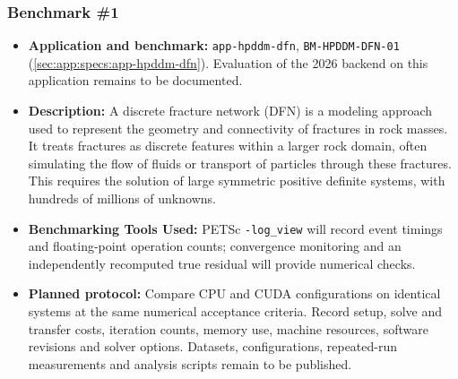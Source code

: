 \subsubsection{Benchmark \#1}
\begin{itemize}
    \item \textbf{Application and benchmark:} \texttt{app-hpddm-dfn}, \texttt{BM-HPDDM-DFN-01} (\cref{sec:app:specs:app-hpddm-dfn}). Evaluation of the 2026 backend on this application remains to be documented.
    \item \textbf{Description:} A discrete fracture network (DFN) is a modeling approach used to represent the geometry and connectivity of fractures in rock masses. It treats fractures as discrete features within a larger rock domain, often simulating the flow of fluids or transport of particles through these fractures. This requires the solution of large symmetric positive definite systems, with hundreds of millions of unknowns.
    \item \textbf{Benchmarking Tools Used:} PETSc \verb!-log_view! will record event timings and floating-point operation counts; convergence monitoring and an independently recomputed true residual will provide numerical checks.
    \item \textbf{Planned protocol:} Compare CPU and CUDA configurations on identical systems at the same numerical acceptance criteria. Record setup, solve and transfer costs, iteration counts, memory use, machine resources, software revisions and solver options. Datasets, configurations, repeated-run measurements and analysis scripts remain to be published.
\end{itemize}

